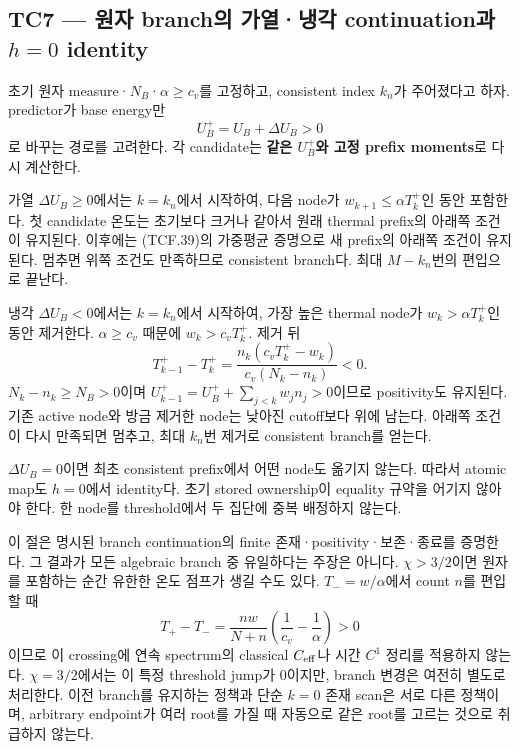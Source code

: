 \documentclass[11pt,a4paper]{article}
\begin{document}
\hypertarget{tc7-uxc6d0uxc790-branchuxc758-uxac00uxc5f4uxb0c9uxac01-continuationuxacfc-h0-identity}{%
\subsection{\texorpdfstring{TC7 --- 원자 branch의 가열·냉각 continuation과 \(h=0\) identity}{TC7 --- 원자 branch의 가열·냉각 continuation과 h=0 identity}}\label{tc7-uxc6d0uxc790-branchuxc758-uxac00uxc5f4uxb0c9uxac01-continuationuxacfc-h0-identity}}

초기 원자 measure·\(N_B\)·\(\alpha\ge c_v\)를 고정하고, consistent index \(k_n\)가 주어졌다고 하자. predictor가 base energy만 \[
U_B^+=U_B+\Delta U_B>0
\tag{TCF.41}
\] 로 바꾸는 경로를 고려한다. 각 candidate는 \textbf{같은 \(U_B^+\)와 고정 prefix moments}로 다시 계산한다.

가열 \(\Delta U_B\ge0\)에서는 \(k=k_n\)에서 시작하여, 다음 node가 \(w_{k+1}\le\alpha T_k^+\)인 동안 포함한다. 첫 candidate 온도는 초기보다 크거나 같아서 원래 thermal prefix의 아래쪽 조건이 유지된다. 이후에는 (TCF.39)의 가중평균 증명으로 새 prefix의 아래쪽 조건이 유지된다. 멈추면 위쪽 조건도 만족하므로 consistent branch다. 최대 \(M-k_n\)번의 편입으로 끝난다.

냉각 \(\Delta U_B<0\)에서는 \(k=k_n\)에서 시작하여, 가장 높은 thermal node가 \(w_k>\alpha T_k^+\)인 동안 제거한다. \(\alpha\ge c_v\) 때문에 \(w_k>c_vT_k^+\). 제거 뒤 \[
T_{k-1}^+-T_k^+
=\frac{n_k(c_vT_k^+-w_k)}{c_v(N_k-n_k)}<0 .
\tag{TCF.42}
\] \(N_k-n_k\ge N_B>0\)이며 \(U_{k-1}^+=U_B^++\sum_{j<k}w_jn_j>0\)이므로 positivity도 유지된다. 기존 active node와 방금 제거한 node는 낮아진 cutoff보다 위에 남는다. 아래쪽 조건이 다시 만족되면 멈추고, 최대 \(k_n\)번 제거로 consistent branch를 얻는다.

\(\Delta U_B=0\)이면 최초 consistent prefix에서 어떤 node도 옮기지 않는다. 따라서 atomic map도 \(h=0\)에서 identity다. 초기 stored ownership이 equality 규약을 어기지 않아야 한다. 한 node를 threshold에서 두 집단에 중복 배정하지 않는다.

이 절은 명시된 branch continuation의 finite 존재·positivity·보존·종료를 증명한다. 그 결과가 모든 algebraic branch 중 유일하다는 주장은 아니다. \(\chi>3/2\)이면 원자를 포함하는 순간 유한한 온도 점프가 생길 수도 있다. \(T_-=w/\alpha\)에서 count \(n\)를 편입할 때 \[
T_+-T_-=
\frac{nw}{N+n}\left(\frac1{c_v}-\frac1\alpha\right)>0
\tag{TCF.43}
\] 이므로 이 crossing에 연속 spectrum의 classical \(C_{\rm eff}\)나 시간 \(C^1\) 정리를 적용하지 않는다. \(\chi=3/2\)에서는 이 특정 threshold jump가 0이지만, branch 변경은 여전히 별도로 처리한다. 이전 branch를 유지하는 정책과 단순 \(k=0\) 존재 scan은 서로 다른 정책이며, arbitrary endpoint가 여러 root를 가질 때 자동으로 같은 root를 고르는 것으로 취급하지 않는다.
\end{document}
